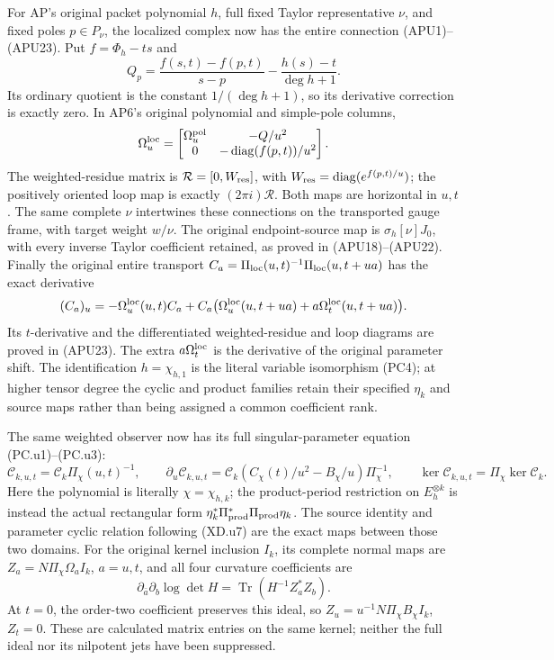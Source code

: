 For AP's original packet polynomial \(h\), full fixed Taylor
representative \(\nu\), and fixed poles \(p\in P_\nu\), the
localized complex now has the entire connection
(APU1)--(APU23).  Put \(f=\Phi_h-ts\) and
\[
 Q_p=\frac{f(s,t)-f(p,t)}{s-p}-\frac{h(s)-t}{\deg h+1}.
\]
Its ordinary quotient is the constant \(1/(\deg h+1)\), so
its derivative correction is exactly zero.  In AP6's original
polynomial and simple-pole columns,
\[
 \Omega_u^{\rm loc}
 =\begin{bmatrix}
      \Omega_u^{\rm pol}&-Q/u^2\\
      0&-\operatorname{diag}(f(p,t))/u^2
   \end{bmatrix}.
\]
The weighted-residue matrix is
\(\mathcal R=[0,W_{\rm res}]\), with
\(W_{\rm res}=\operatorname{diag}(e^{f(p,t)/u})\);
the positively oriented loop map is exactly
\((2\pi i)\mathcal R\).
Both maps are horizontal in \(u,t\).
The same complete \(\nu\) intertwines these connections on
the transported gauge frame, with target weight \(w/\nu\).
The original endpoint-source map is
\(\sigma_h[\nu]J_0\), with every inverse Taylor coefficient
retained, as proved in (APU18)--(APU22).
Finally the original entire transport
\(C_a=\Pi_{\rm loc}(u,t)^{-1}\Pi_{\rm loc}(u,t+ua)\)
has the exact derivative
\[
 (C_a)_u=-\Omega_u^{\rm loc}(u,t)C_a+
 C_a\bigl(\Omega_u^{\rm loc}(u,t+ua)
                   +a\Omega_t^{\rm loc}(u,t+ua)\bigr).
\]
Its \(t\)-derivative and the differentiated weighted-residue and
loop diagrams are proved in (APU23).  The extra
\(a\Omega_t^{\rm loc}\) is the derivative of the original
parameter shift.  The identification \(h=\chi_{h,1}\) is the
literal variable isomorphism (PC4); at higher tensor degree the
cyclic and product families retain their specified
\(\eta_k\) and source maps rather than being assigned a common
coefficient rank.

The same weighted observer now has its full singular-parameter
equation (PC.u1)--(PC.u3):
\[
 \mathcal C_{k,u,t}=\mathcal C_k\Pi_\chi(u,t)^{-1},\qquad
 \partial_u\mathcal C_{k,u,t}
   =\mathcal C_k(C_\chi(t)/u^2-B_\chi/u)\Pi_\chi^{-1},
 \qquad
 \ker\mathcal C_{k,u,t}=\Pi_\chi\ker\mathcal C_k.
\]
Here the polynomial is literally \(\chi=\chi_{h,k}\);
the product-period restriction on \(E_h^{\otimes k}\) is
instead the actual rectangular form
\(\eta_k^*\Pi_{\rm prod}^*\Pi_{\rm prod}\eta_k\).
The source identity and parameter cyclic relation following
(XD.u7) are the exact maps between those two domains.
For the original kernel inclusion \(I_k\), its complete
normal maps are \(Z_a=N\Pi_\chi\Omega_a I_k\), \(a=u,t\),
and all four curvature coefficients are
\[
 \partial_{\bar a}\partial_b\log\det H
       =\operatorname{Tr}(H^{-1}Z_a^*Z_b).
\]
At \(t=0\), the order-two coefficient preserves this ideal,
so \(Z_u=u^{-1}N\Pi_\chi B_\chi I_k\), \(Z_t=0\).
These are calculated matrix entries on the same kernel; neither
the full ideal nor its nilpotent jets have been suppressed.

